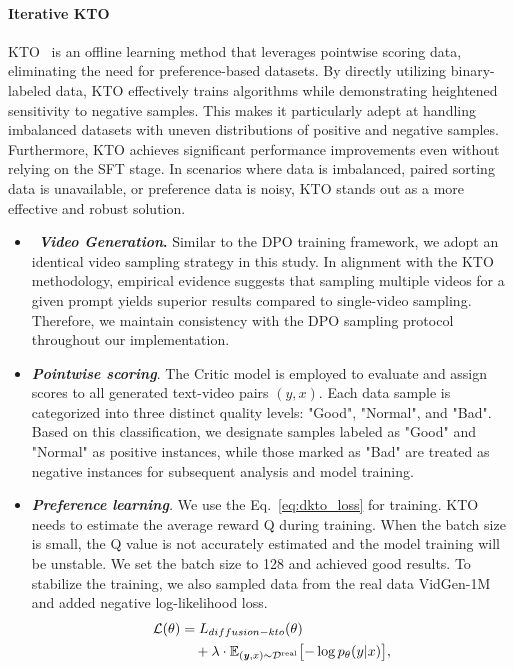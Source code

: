 \paragraph{Iterative KTO} KTO~\cite{ethayarajh2024ktomodelalignmentprospect} is an offline learning method that leverages pointwise scoring data, eliminating the need for preference-based datasets. By directly utilizing binary-labeled data, KTO effectively trains algorithms while demonstrating heightened sensitivity to negative samples. This makes it particularly adept at handling imbalanced datasets with uneven distributions of positive and negative samples. Furthermore, KTO achieves significant performance improvements even without relying on the SFT stage. In scenarios where data is imbalanced, paired sorting data is unavailable, or preference data is noisy, KTO stands out as a more effective and robust solution.
\begin{itemize}
\setlength{\itemsep}{2pt}
\item ~\textbf{\textit{Video Generation}.} Similar to the DPO training framework, we adopt an identical video sampling strategy in this study. In alignment with the KTO~\cite{ethayarajh2024ktomodelalignmentprospect} methodology, empirical evidence suggests that sampling multiple videos for a given prompt yields superior results compared to single-video sampling. Therefore, we maintain consistency with the DPO sampling protocol throughout our implementation.

\item \textit{\textbf{Pointwise scoring}}.
The Critic model is employed to evaluate and assign scores to all generated text-video pairs 
$(y, x)$. Each data sample is categorized into three distinct quality levels: "Good", "Normal", and "Bad". Based on this classification, we designate samples labeled as "Good" and "Normal" as positive instances, while those marked as "Bad" are treated as negative instances for subsequent analysis and model training.

\item  \textit{\textbf{Preference learning}.} 
We use the Eq.~\ref{eq:dkto_loss} for training. KTO needs to estimate the average reward Q during training. When the batch size is small, the Q value is not accurately estimated and the model training will be unstable. We set the batch size to 128 and achieved good results. To stabilize the training, we also sampled data from the real data VidGen-1M~\cite{tan2024vidgen1mlargescaledatasettexttovideo} and added negative log-likelihood loss.
\begin{equation}
\begin{aligned}
\mathcal{L}(\theta) &= L_{diffusion-kto}(\theta) \\
&\quad + \lambda \cdot \mathbb{E}_{(\textbf{\textit{y}}, x) \sim \mathcal{D}^{\mathrm{real}}} \bigl[-\log p_{\theta}(y|x)\bigr],
\end{aligned}
\end{equation}

\end{itemize}

